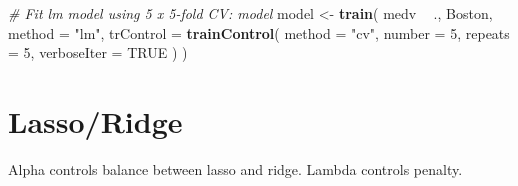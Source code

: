 \documentclass[]{book}
\newenvironment{Shaded}{\begin{snugshade}}{\end{snugshade}}
\newcommand{\KeywordTok}[1]{\textcolor[rgb]{0.13,0.29,0.53}{\textbf{#1}}}
\newcommand{\DataTypeTok}[1]{\textcolor[rgb]{0.13,0.29,0.53}{#1}}
\newcommand{\DecValTok}[1]{\textcolor[rgb]{0.00,0.00,0.81}{#1}}
\newcommand{\StringTok}[1]{\textcolor[rgb]{0.31,0.60,0.02}{#1}}
\newcommand{\CommentTok}[1]{\textcolor[rgb]{0.56,0.35,0.01}{\textit{#1}}}
\newcommand{\OtherTok}[1]{\textcolor[rgb]{0.56,0.35,0.01}{#1}}
\newcommand{\OperatorTok}[1]{\textcolor[rgb]{0.81,0.36,0.00}{\textbf{#1}}}
\newcommand{\NormalTok}[1]{#1}
\theoremstyle{definition}
\theoremstyle{definition}
\theoremstyle{definition}
\theoremstyle{remark}
\begin{document}
\begin{Shaded}
\end{Shaded}

\begin{Shaded}
\begin{Highlighting}[]
\CommentTok{# Fit lm model using 5 x 5-fold CV: model}
\NormalTok{model <-}\StringTok{ }\KeywordTok{train}\NormalTok{(}
\NormalTok{  medv }\OperatorTok{~}\StringTok{ }\NormalTok{., }
\NormalTok{  Boston,}
  \DataTypeTok{method =} \StringTok{"lm"}\NormalTok{,}
  \DataTypeTok{trControl =} \KeywordTok{trainControl}\NormalTok{(}
    \DataTypeTok{method =} \StringTok{"cv"}\NormalTok{, }\DataTypeTok{number =} \DecValTok{5}\NormalTok{,}
    \DataTypeTok{repeats =} \DecValTok{5}\NormalTok{, }\DataTypeTok{verboseIter =} \OtherTok{TRUE}
\NormalTok{  )}
\NormalTok{)}
\end{Highlighting}
\end{Shaded}

\section{Lasso/Ridge}\label{lassoridge}

Alpha controls balance between lasso and ridge. Lambda controls penalty.
\end{document}
